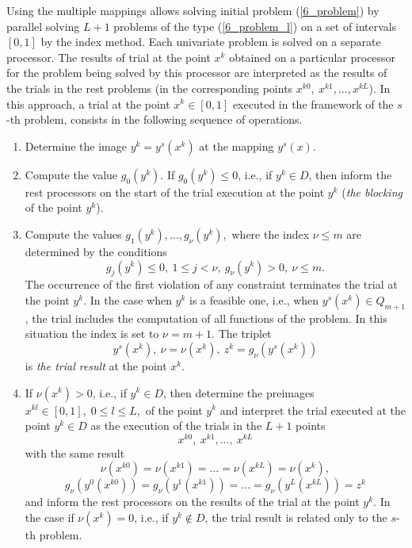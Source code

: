Using the multiple mappings allows solving initial problem (\ref{6_problem}) by parallel solving $L+1$ problems of the type (\ref{6_problem_l}) on a set of intervals $[0,1]$ by the index method. Each univariate problem is solved on a separate processor. The results of trial at the point $x^k$ obtained on a particular processor for the problem being solved by this processor are interpreted as the results of the trials in the rest problems (in the corresponding points $x^{k0},\ x^{k1},...,x^{kL}$). In this approach, a trial at the point $x^k \in [0,1]$ executed in the framework of the $s$-th problem, consists in the following sequence of operations.
\begin{enumerate}
	\item Determine the image $y^k=y^s(x^k)$ at the mapping  $y^s(x)$.
	\item Compute the value $g_0(y^k)$. If $g_0(y^k) \leq 0$, i.e., if $y^k \in D$, then inform the rest processors on the start of the trial execution at the point $y^k$ (\textit{the blocking} of the point $y^k$).
	\item Compute the values $g_1(y^k),...,g_\nu(y^k),$ where the index $\nu \leq m$ are determined by the conditions
	\[
	g_j(y^k)\leq 0,\ 1\leq j< \nu,\ g_\nu(y^k) > 0,\ \nu \leq m.
	\]
	The occurrence of the first violation of any constraint terminates the trial at the point $y^k$. In the case when $y^k$ is a feasible one, i.e., when $y^s(x^k) \in Q_{m+1}$, the trial includes the computation of all functions of the problem. In this situation the index is set to $\nu = m+1$. The triplet
	\begin{equation}\label{6_triplet} 
	y^s(x^k),\ \nu = \nu(x^k),\ z^k=g_\nu(y^s(x^k))
	\end{equation}
	is  \textit{the trial result} at the point $x^k$.
	\item If $\nu (x^k)>0$, i.e., if $y^k \in D$, then determine the preimages $x^{kl} \in [0,1],\; 0\leq l \leq L,$ of the point $y^k$ and interpret the trial executed at the point $y^k \in D$ as the execution of the trials in the $L+1$ points 
	\[
	x^{k0},\ x^{k1},...,\ x^{kL}
	\]
	with the same result 
	\[
	\nu(x^{k0})=\nu(x^{k1})=...=\nu(x^{kL})=\nu(x^k),	
	\]
	\[
	g_\nu(y^0(x^{k0}))=g_\nu(y^1(x^{k1}))=...=g_\nu(y^L(x^{kL}))=z^k	
	\]
	and inform the rest processors on the results of the trial at the point $y^k$.	
	In the case if $\nu (x^k)=0$, i.e., if $y^k \notin D$, the trial result is related only to the $s$-th problem.	
\end{enumerate}

